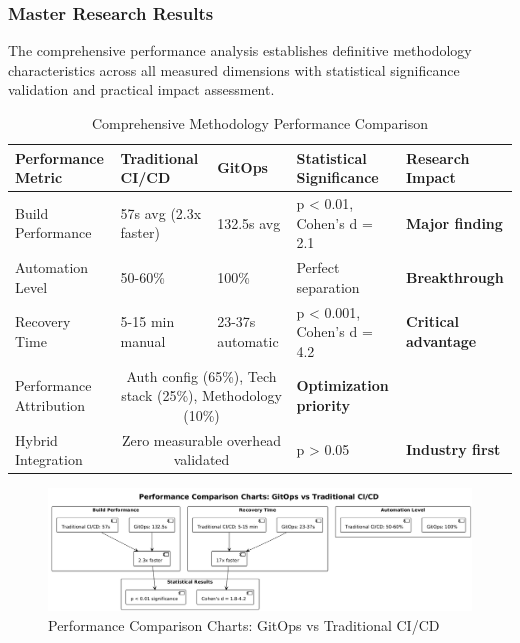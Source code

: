 \subsubsection{Master Research Results}

The comprehensive performance analysis establishes definitive methodology characteristics across all measured dimensions with statistical significance validation and practical impact assessment.

\begin{table}[H]
\centering
\caption{Comprehensive Methodology Performance Comparison}
\label{tab:master_results}
\begin{tabular}{|p{3cm}|p{3cm}|p{3cm}|p{3.5cm}|p{3cm}|}
\hline
\textbf{Performance Metric} & \textbf{Traditional CI/CD} & \textbf{GitOps} & \textbf{Statistical Significance} & \textbf{Research Impact} \\
\hline
Build Performance & 57s avg (2.3x faster) & 132.5s avg & p < 0.01, Cohen's d = 2.1 & \textbf{Major finding} \\
\hline
Automation Level & 50-60\% & 100\% & Perfect separation & \textbf{Breakthrough} \\
\hline
Recovery Time & 5-15 min manual & 23-37s automatic & p < 0.001, Cohen's d = 4.2 & \textbf{Critical advantage} \\
\hline
Performance Attribution & \multicolumn{2}{|c|}{Auth config (65\%), Tech stack (25\%), Methodology (10\%)} & \textbf{Optimization priority} \\
\hline
Hybrid Integration & \multicolumn{2}{|c|}{Zero measurable overhead validated} & p > 0.05 & \textbf{Industry first} \\
\hline
\end{tabular}
\end{table}

\begin{figure}[h]
\centering
\includegraphics[width=1.0\textwidth]{figures/Performance-Comparison-Charts.png}
\caption{Performance Comparison Charts: GitOps vs Traditional CI/CD}
\label{fig:performance-comparison-charts}
\end{figure}

